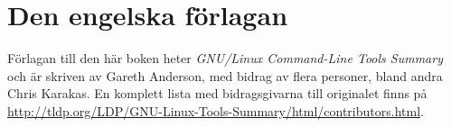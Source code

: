 \documentclass[10pt,a4paper,final]{book}
\begin{document}
\section{Den engelska förlagan}

Förlagan till den här boken heter \textit{GNU/Linux Command-Line Tools Summary} och är skriven av Gareth Anderson, med bidrag av flera personer, bland andra Chris Karakas. En komplett lista med bidragsgivarna till originalet finns på \url{http://tldp.org/LDP/GNU-Linux-Tools-Summary/html/contributors.html}. 

\end{document}
